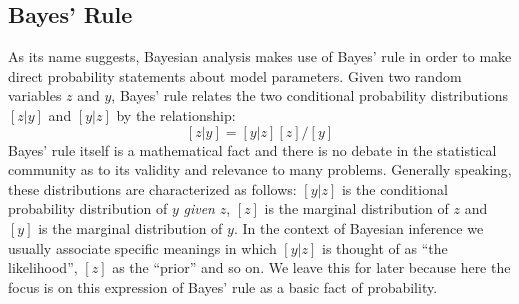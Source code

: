 \subsection{Bayes' Rule}

As its name suggests, Bayesian analysis makes use of Bayes' rule in
order to make direct probability statements about model
parameters. Given two random variables $z$ and $y$, Bayes' rule relates
the two conditional probability distributions $[z|y]$ and $[y|z]$ by
the relationship:
\[
[z|y] = [y|z][z]/[y]
\]
Bayes' rule itself is a mathematical fact and there is no debate in
the statistical community as to its validity and relevance to many
problems. Generally speaking, these distributions are characterized as
follows: $[y|z]$ is the conditional probability distribution of $y$
{\it given} $z$, $[z]$ is the marginal distribution of $z$ and $[y]$
is the marginal distribution of $y$. In the context of Bayesian
inference we usually associate specific meanings in which $[y|z]$ is
thought of as ``the likelihood'', $[z]$ as the ``prior'' and so on. We
leave this for later because here the focus is on this expression of
Bayes' rule as a basic fact of probability.

